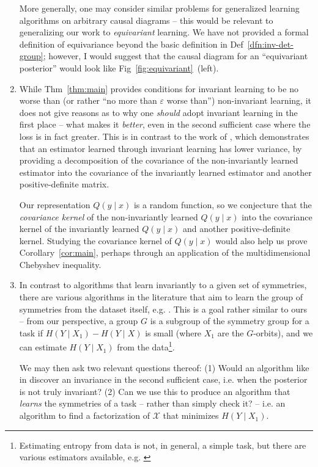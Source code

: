 \documentclass[12pt]{article}
\theoremstyle{definition}
\numberwithin{equation}{section}
\numberwithin{figure}{section}
\numberwithin{table}{section}
\begin{document}
\begin{enumerate}
    More generally, one may consider similar problems for generalized learning algorithms on arbitrary causal diagrams -- this would be relevant to generalizing our work to \emph{equivariant} learning. We have not provided a formal definition of equivariance beyond the basic definition in Def~\ref{dfn:inv-det-group}; however, I would suggest that the causal diagram for an ``equivariant posterior'' would look like Fig~\ref{fig:equivariant}~(left). 
    
    \item While Thm~\ref{thm:main} provides conditions for invariant learning to be no worse than (or rather ``no more than $\varepsilon$ worse than'') non-invariant learning, it does not give reasons as to why one \emph{should} adopt invariant learning in the first place -- what makes it \emph{better}, even in the second sufficient case where the loss is in fact greater. This is in contrast to the work of \cite{sxchen}, which demonstrates that an estimator learned through invariant learning has lower variance, by providing a decomposition of the covariance of the non-invariantly learned estimator into the covariance of the invariantly learned estimator and another positive-definite matrix. 
    
    Our representation $Q(y\mid x)$ is a random function, so we conjecture that the \emph{covariance kernel} of the non-invariantly learned $Q(y\mid x)$ into the covariance kernel of the invariantly learned $Q(y\mid x)$ and another positive-definite kernel. Studying the covariance kernel of $Q(y\mid x)$ would also help us prove Corollary~\ref{cor:main}, perhaps through an application of the multidimensional Chebyshev inequality. 
    
    \item In contrast to algorithms that learn invariantly to a given set of symmetries, there are various algorithms in the literature that aim to learn the group of symmetries from the dataset itself, e.g. \cite{benton, cubuk, wilk}. This is a goal rather similar to ours -- from our perspective, a group $G$ is a subgroup of the symmetry group for a task if $H(Y\mid X_1)-H(Y\mid X)$ is small (where $X_1$ are the $G$-orbits), and we can estimate $H(Y\mid X_1)$ from the data\footnote{Estimating entropy from data is not, in general, a simple task, but there are various estimators available, e.g. \cite{entropy1, entropy2, entropy3}}.
    
    We may then ask two relevant questions thereof: (1) Would an algorithm like in \cite{benton, cubuk, wilk} discover an invariance in the second sufficient case, i.e. when the posterior is not truly invariant? (2) Can we use this to produce an algorithm that \emph{learns} the symmetries of a task -- rather than simply check it? -- i.e. an algorithm to find a factorization of $\mathcal{X}$ that minimizes $H(Y\mid X_1)$.
\end{enumerate}
\end{document}
